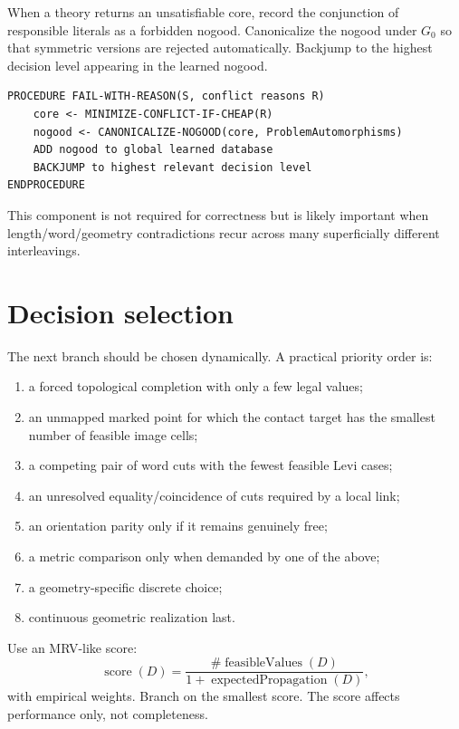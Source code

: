 \documentclass[11pt]{article}
\begin{document}
When a theory returns an unsatisfiable core, record the conjunction of responsible literals as a forbidden nogood.  Canonicalize the nogood under $G_0$ so that symmetric versions are rejected automatically.  Backjump to the highest decision level appearing in the learned nogood.

\begin{lstlisting}[caption={Conflict-learning wrapper.}]
PROCEDURE FAIL-WITH-REASON(S, conflict reasons R)
    core <- MINIMIZE-CONFLICT-IF-CHEAP(R)
    nogood <- CANONICALIZE-NOGOOD(core, ProblemAutomorphisms)
    ADD nogood to global learned database
    BACKJUMP to highest relevant decision level
ENDPROCEDURE
\end{lstlisting}

This component is not required for correctness but is likely important when length/word/geometry contradictions recur across many superficially different interleavings.

\section{Decision selection}
\label{sec:branching}

The next branch should be chosen dynamically.  A practical priority order is:
\begin{enumerate}
  \item a forced topological completion with only a few legal values;
  \item an unmapped marked point for which the contact target has the smallest number of feasible image cells;
  \item a competing pair of word cuts with the fewest feasible Levi cases;
  \item an unresolved equality/coincidence of cuts required by a local link;
  \item an orientation parity only if it remains genuinely free;
  \item a metric comparison only when demanded by one of the above;
  \item a geometry-specific discrete choice;
  \item continuous geometric realization last.
\end{enumerate}

Use an MRV-like score:
\[
  \operatorname{score}(D)
  =\frac{\#\operatorname{feasibleValues}(D)}
  {1+\operatorname{expectedPropagation}(D)},
\]
with empirical weights.  Branch on the smallest score.  The score affects performance only, not completeness.
\end{document}
